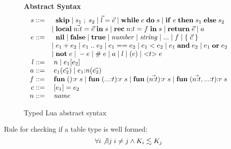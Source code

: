 \begin{figure}[!ht]
\textbf{Abstract Syntax}\\
\dstart
$$
\begin{array}{rl}
s ::= & \;\; \mathbf{skip} \; | \;
s_{1} \; ; \; s_{2} \; | \;
\vec{l} = \vec{e}  \; | \;
\mathbf{while} \; e \; \mathbf{do} \; s \; | \;
\mathbf{if} \; e \; \mathbf{then} \; s_{1} \; \mathbf{else} \; s_{2}\\
& | \; \mathbf{local} \; \vec{n{:}t} = \vec{e} \; \mathbf{in} \; s \; | \;
\mathbf{rec} \; n{:}t = f \; \mathbf{in} \; s \; | \;
\mathbf{return} \; \vec{e} \; | \;
a\\
e ::= & \;\; \mathbf{nil} \; | \;
\mathbf{false} \; | \;
\mathbf{true} \; | \;
{\it number} \; | \;
{\it string} \; | \;
{...} \; | \;
f \; | \;
\{ \; \vec{c} \; \} \\
& | \; e_{1} + e_{2} \; | \;
e_{1} \; {..} \; e_{2} \; | \;
e_{1} == e_{2} \; | \;
e_{1} < e_{2} \; | \;
e_{1} \; \mathbf{and} \; e_{2} \; | \;
e_{1} \; \mathbf{or} \; e_{2} \\
& | \; \mathbf{not} \; e \; | \;
- e \; | \;
\# \; e \; | \;
a \; | \;
l \; | \;
(e) \; | \;
{<}t{>} \; e\\
l ::= & \; n \; | \;
e_{1}[e_{2}]\\
a ::= & \; e_{1}(\vec{e_{2}}) \; | \;
e_{1}{:}n(\vec{e_{2}})\\
f ::= & \; \mathbf{fun} \; (){:}r \; s \; | \;
\mathbf{fun} \; ({...}{:}t){:}r \; s \; | \;
\mathbf{fun} \; (\vec{n{:}t}){:}r \; s \; | \;
\mathbf{fun} \; (\vec{n{:}t},{...}{:}t){:}r \; s\\
c ::= & \; [e_{1}] = e_{2}\\
n ::= & \; {\it name}\\
\end{array}
$$
\dend
\caption{Typed Lua abstract syntax}
\label{fig:syntax}
\end{figure}

Rule for checking if a table type is well formed:
\[
\forall i \not\exists j \; i \not= j \wedge K_{i} \lesssim K_{j}
\]


